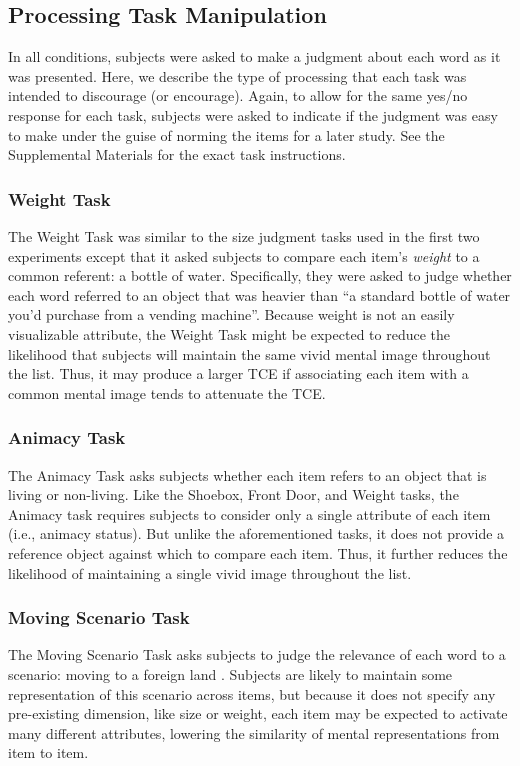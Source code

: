 \documentclass[man,natbib,floatsintext]{apa6} %
\begin{document}
\subsection{Processing Task Manipulation}
In all conditions, subjects were asked to make a judgment about each word as it was presented. Here, we describe the type of processing that each task was intended to discourage (or encourage). Again, to allow for the same yes/no response for each task, subjects were asked to indicate if the judgment was easy to make under the guise of norming the items for a later study. See the Supplemental Materials for the exact task instructions.



\subsubsection{Weight Task} The Weight Task was similar to the size judgment tasks used in the first two experiments except that it asked subjects to compare each item's \emph{weight} to a common referent: a bottle of water. Specifically, they were asked to judge whether each word referred to an object that was heavier than ``a standard bottle of water you'd purchase from a vending machine''. Because weight is not an easily visualizable attribute, the Weight Task might be expected to reduce the likelihood that subjects will maintain the same vivid mental image throughout the list. Thus, it may produce a larger TCE if associating each item with a common mental image tends to attenuate the TCE.

\subsubsection{Animacy Task} The Animacy Task asks subjects whether each item refers to an object that is living or non-living. Like the Shoebox, Front Door, and Weight tasks, the Animacy task requires subjects to consider only a single attribute of each item (i.e., animacy status). But unlike the aforementioned tasks, it does not provide a reference object against which to compare each item. Thus, it further reduces the likelihood of maintaining a single vivid image throughout the list. 

\subsubsection{Moving Scenario Task} The Moving Scenario Task asks subjects to judge the relevance of each word to a scenario: moving to a foreign land \citep{NairEtal17}. Subjects are likely to maintain some representation of this scenario across items, but because it does not specify any pre-existing dimension, like size or weight, each item may be expected to activate many different attributes, lowering the similarity of mental representations from item to item.
\end{document}
